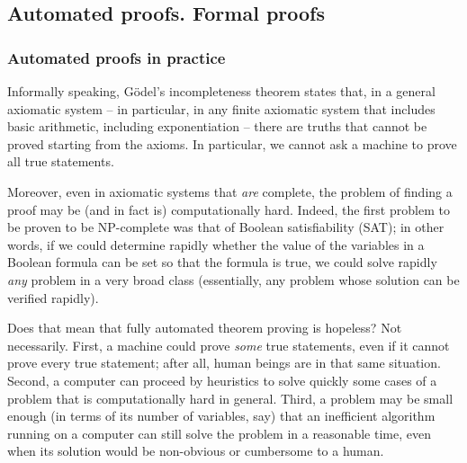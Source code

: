\subsection{Automated proofs. Formal proofs}

\subsubsection{Automated proofs in practice}

Informally speaking,
G\"odel's incompleteness theorem states that, in a general axiomatic
system -- in particular, in any finite axiomatic system that includes basic
arithmetic, including exponentiation -- there are truths that cannot be proved
starting from the axioms. In particular, we cannot ask a machine to prove
all true statements.

Moreover, even in axiomatic systems that {\em are} complete, the problem
of finding a proof may be (and in fact is) computationally hard. Indeed,
the first problem to be proven to be NP-complete was that of Boolean
satisfiability (SAT); in other words, if we could determine rapidly whether the
value of the variables in a Boolean formula can be set so that the formula
is true, we could solve rapidly
{\em any} problem in a very broad class (essentially, any problem whose
solution can be verified rapidly).

Does that mean that fully automated theorem proving is hopeless? Not
necessarily. First, a machine could prove {\em some} true statements,
even if it cannot prove every true statement; after all, human beings are in
that same situation. Second, a computer can proceed by heuristics to solve
quickly some cases of a problem that is computationally hard in general.
Third, a problem may be small enough (in terms of its number of variables, say)
that an inefficient algorithm running on a computer can still solve the
problem in a
reasonable time, even when its solution would be non-obvious or cumbersome to a
human.

